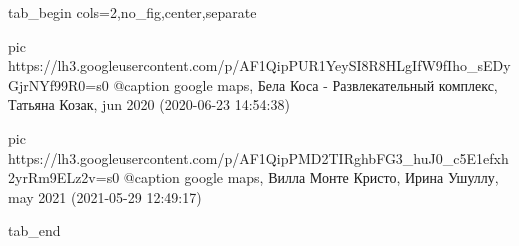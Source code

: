  
 
 
 
 

\ifcmt
  tab_begin cols=2,no_fig,center,separate

		 pic https://lh3.googleusercontent.com/p/AF1QipPUR1YeySI8R8HLgIfW9fIho_sEDyGjrNYf99R0=s0
		 @caption google maps, Бела Коса - Развлекательный комплекс, Татьяна Козак, jun 2020 (2020-06-23 14:54:38)

		 pic https://lh3.googleusercontent.com/p/AF1QipPMD2TIRghbFG3_huJ0_c5E1efxh2yrRm9ELz2v=s0
		 @caption google maps, Вилла Монте Кристо, Ирина Ушуллу, may 2021 (2021-05-29 12:49:17)

  tab_end
\fi
